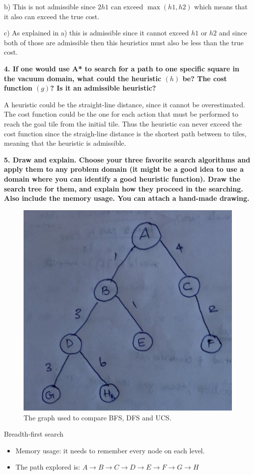 \documentclass[a4paper,10pt]{article}
\begin{document}
b) This is not admissible since $2h1$ can exceed $\max(h1, h2)$ which means that it also can exceed the true cost.

c) As explained in a) this is admissible since it cannot exceed $h1$ or $h2$ and since both of those are admissible then
this heuristics must also be less than the true cost.

\textbf{4. If one would use A* to search for a path to one specific square in the vacuum domain, what could the heuristic $(h)$ be? The cost function $(g)$? Is it an admissible heuristic?}

A heuristic could be the straight-line distance, since it cannot be overestimated. 
The cost function could be the one for each action that must be performed to reach the goal tile from the initial tile.
Thus the heuristic can never exceed the cost function since the straigh-line distance is the shortest path between to tiles, meaning that the heuristic is admissible.

\textbf{5. Draw and explain. 
Choose your three favorite search algorithms and apply them to any problem domain (it might be a good idea to use a domain where you can identify a good heuristic function). 
Draw the search tree for them, and explain how they proceed in the searching. 
Also include the memory usage. 
You can attach a hand-made drawing.}

\begin{figure}[ht]
	\centering
	\includegraphics[width=.4\textwidth]{graph.png}
	\caption{The graph used to compare BFS, DFS and UCS.}
\end{figure}

Breadth-first search
\begin{itemize}
	\item Memory usage: it needs to remember every node on each level.
	\item The path explored is: $A \rightarrow B \rightarrow C \rightarrow D 
	\rightarrow E \rightarrow F \rightarrow G \rightarrow H$
\end{itemize}
\end{document}
